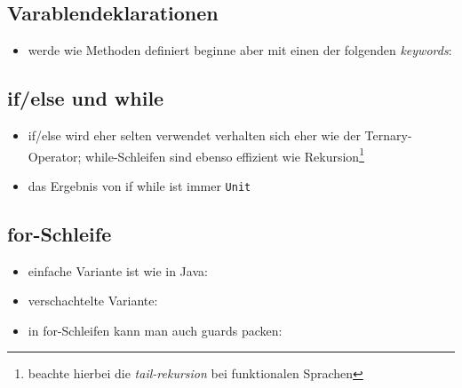 \subsection{Varablendeklarationen}
\begin{itemize}
  \item werde wie Methoden definiert beginne aber mit einen der folgenden
  \textit{keywords}:
  

\end{itemize}


\subsection{if/else und while}
\begin{itemize}
  \item if/else wird eher selten verwendet \und verhalten sich eher wie
  der Ternary-Operator; while-Schleifen sind ebenso effizient wie 
  Rekursion\footnote{beachte hierbei die \textit{tail-rekursion} bei
  funktionalen Sprachen}
  
  
  
  \item das Ergebnis von if \und while ist immer \texttt{Unit}    
\end{itemize}


\subsection{for-Schleife}
\begin{itemize}
  \item einfache Variante ist wie in Java:
  
  
  
  \item verschachtelte Variante:
  
  
  
  \item in for-Schleifen kann man auch guards packen:
  
  
\end{itemize}



